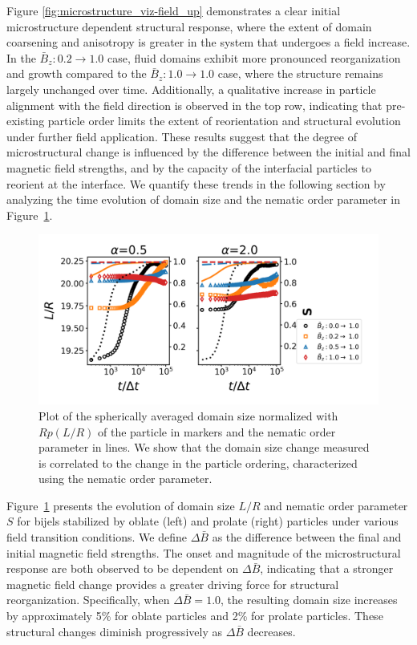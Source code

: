 Figure \ref{fig:microstructure_viz-field_up} demonstrates a clear initial microstructure dependent structural response, 
where the extent of domain coarsening and anisotropy is greater 
in the system that undergoes a field increase. In the \(\bar{B}_z: 0.2 \rightarrow 1.0\) case, fluid domains exhibit more pronounced reorganization and growth 
compared to the \(\bar{B}_z: 1.0 \rightarrow 1.0\) case, where the structure remains largely unchanged over time.
Additionally, a qualitative increase in particle alignment with the field direction is observed in the top row, indicating that pre-existing particle order 
limits the extent of reorientation and structural evolution under further field application. These results suggest that the degree of microstructural change 
is influenced by the difference between the initial and final magnetic field strengths, and by the capacity of the interfacial particles to reorient at the interface. 
We quantify these trends in the following section by analyzing the time evolution of domain size and the nematic order parameter in 
Figure~\ref{fig:domain_size-field_up}.

\begin{figure} 
\centering 
\includegraphics[scale=0.6]{../figures/results/paper2/domain_size-field_up.png} 
\caption{Plot of the spherically averaged domain size normalized with $Rp(L/R)$ of the particle in markers and the nematic order parameter in lines. 
         We show that the domain size change measured is correlated to the change in the particle ordering, characterized using the nematic order parameter.} 
\label{fig:domain_size-field_up} 
\end{figure}

Figure~\ref{fig:domain_size-field_up} presents the evolution of domain size \(L/R\) and nematic order parameter \(S\) for bijels stabilized by oblate (left) 
and prolate (right) particles under various field transition conditions. We define \(\Delta \bar{B}\) as the difference between the final and initial magnetic 
field strengths. The onset and magnitude of the microstructural response are both observed to be dependent on \(\Delta \bar{B}\), indicating that a stronger 
magnetic field change provides a greater driving force for structural reorganization. Specifically, when \(\Delta \bar{B} = 1.0\), the resulting domain size 
increases by approximately 5\% for oblate particles and 2\% for prolate particles. These structural changes diminish progressively as \(\Delta \bar{B}\) decreases.

